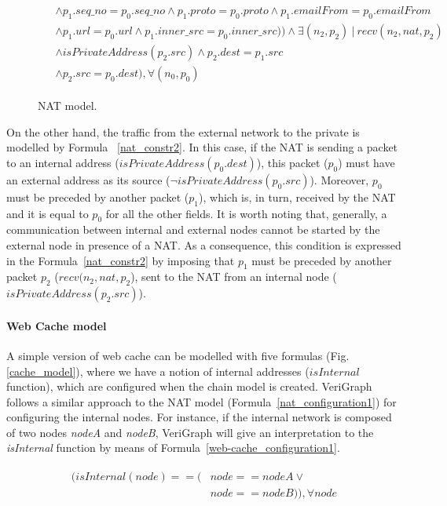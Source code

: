\begin{figure}[h]
{\begin{subequations}
\begin{align}
\begin{split}
			& \wedge p_{1}.seq\_no = p_{0}.seq\_no \wedge p_{1}.proto = p_{0}.proto \wedge p_{1}.emailFrom = p_{0}.emailFrom \\
			& \wedge p_{1}.url = p_{0}.url \wedge p_{1}.inner\_src = p_{0}.inner\_src) ) \wedge \exists (n_{2}, p_{2}) \: | \:  recv(n_{2}, nat, p_{2}) \\
			& \wedge isPrivateAddress(p_{2}.src) \wedge p_{2}.dest = p_{1}.src  \\
			& \wedge p_{2}.src = p_{0}.dest), \forall (n_{0}, p_{0})
			\end{split}
			\end{align}
		\end{subequations}
	}%
	\caption{NAT model.}
	\label{nat_model}
\end{figure}

On the other hand, the traffic from the external network to the private is modelled by Formula ~\ref{nat_constr2}. In this case, if the NAT is sending a packet to an internal address (\textit{$isPrivateAddress(p_{0}.dest)$}), this packet (\textit{$p_0$}) must have an external address as its source (\textit{$\neg isPrivateAddress(p_{0}.src)$}). Moreover, \textit{$p_0$} must be preceded by another packet (\textit{$p_1$}), which is, in turn, received by the NAT and it is equal to \textit{$p_0$} for all the other fields. It is worth noting that, generally, a communication between internal and external nodes cannot be started by the external node in presence of a NAT. As a consequence, this condition is expressed in the Formula~\ref{nat_constr2} by imposing that \textit{$p_1$} must be preceded by another packet \textit{$p_2$} (\textit{$ recv(n_{2}, nat, p_{2}$}), sent to the NAT from an internal node (\textit{$isPrivateAddress(p_{2}.src)$}).

\paragraph{Web Cache model} A simple version of web cache can be modelled with five formulas (Fig. \ref{cache_model}), where we have a notion of internal addresses (\textit{$isInternal$} function), which are configured when the chain model is created. VeriGraph follows a similar approach to the NAT model (Formula~\ref{nat_configuration1}) for configuring the internal nodes. For instance, if the internal network is composed of two nodes \textit{nodeA} and \textit{nodeB}, VeriGraph will give an interpretation to the \textit{isInternal} function by means of Formula~\ref{web-cache_configuration1}.
\begin{figure}[h]
	{\footnotesize
		\begin{subequations}
			\begin{align}
				\begin{split}
					\label{web-cache_configuration1}
					(isInternal(node) == (& node == nodeA \vee \\
					& node == nodeB)), \forall node
				\end{split}
			\end{align}
		\end{subequations}
	}%
\end{figure}

